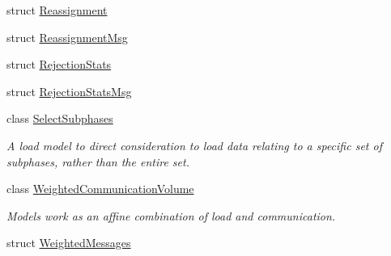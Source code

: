 \begin{DoxyCompactItemize}
\item 
struct \hyperlink{structvt_1_1vrt_1_1collection_1_1balance_1_1_reassignment}{Reassignment}
\item 
struct \hyperlink{structvt_1_1vrt_1_1collection_1_1balance_1_1_reassignment_msg}{Reassignment\+Msg}
\item 
struct \hyperlink{structvt_1_1vrt_1_1collection_1_1balance_1_1_rejection_stats}{Rejection\+Stats}
\item 
struct \hyperlink{structvt_1_1vrt_1_1collection_1_1balance_1_1_rejection_stats_msg}{Rejection\+Stats\+Msg}
\item 
class \hyperlink{classvt_1_1vrt_1_1collection_1_1balance_1_1_select_subphases}{Select\+Subphases}
\begin{DoxyCompactList}\small\item\em A load model to direct consideration to load data relating to a specific set of subphases, rather than the entire set. \end{DoxyCompactList}\item 
class \hyperlink{classvt_1_1vrt_1_1collection_1_1balance_1_1_weighted_communication_volume}{Weighted\+Communication\+Volume}
\begin{DoxyCompactList}\small\item\em Models work as an affine combination of load and communication. \end{DoxyCompactList}\item 
struct \hyperlink{structvt_1_1vrt_1_1collection_1_1balance_1_1_weighted_messages}{Weighted\+Messages}
\end{DoxyCompactItemize}
